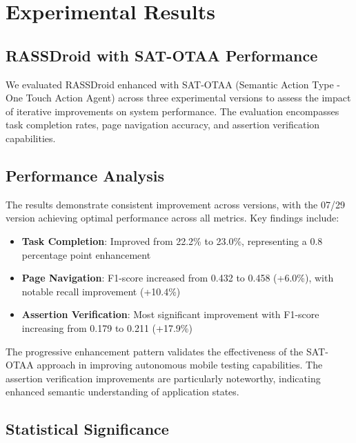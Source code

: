 
\section{Experimental Results}

\subsection{RASSDroid with SAT-OTAA Performance}

We evaluated RASSDroid enhanced with SAT-OTAA (Semantic Action Type - One Touch Action Agent) across three experimental versions to assess the impact of iterative improvements on system performance. The evaluation encompasses task completion rates, page navigation accuracy, and assertion verification capabilities.



\subsection{Performance Analysis}

The results demonstrate consistent improvement across versions, with the 07/29 version achieving optimal performance across all metrics. Key findings include:

\begin{itemize}
    \item \textbf{Task Completion}: Improved from 22.2\% to 23.0\%, representing a 0.8 percentage point enhancement
    \item \textbf{Page Navigation}: F1-score increased from 0.432 to 0.458 (+6.0\%), with notable recall improvement (+10.4\%)
    \item \textbf{Assertion Verification}: Most significant improvement with F1-score increasing from 0.179 to 0.211 (+17.9\%)
\end{itemize}

The progressive enhancement pattern validates the effectiveness of the SAT-OTAA approach in improving autonomous mobile testing capabilities. The assertion verification improvements are particularly noteworthy, indicating enhanced semantic understanding of application states.

\subsection{Statistical Significance}

